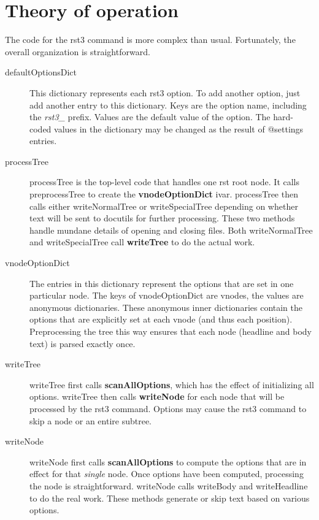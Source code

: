 \documentclass[a4paper,10pt,english]{sphinxmanual}
\begin{document}
\section{Theory of operation}
\label{rstplugin3:theory-of-operation}
The code for the rst3 command is more complex than usual. Fortunately, the
overall organization is straightforward.
\begin{description}
\item[{defaultOptionsDict}] \leavevmode
This dictionary represents each rst3 option.
To add another option, just add another entry to this dictionary.
Keys are the option name, including the \emph{rst3\_} prefix.
Values are the default value of the option.
The hard-coded values in the dictionary may be changed as the result of @settings entries.

\item[{processTree}] \leavevmode
processTree is the top-level code that handles one rst root node.
It calls preprocessTree to create the \textbf{vnodeOptionDict} ivar.
processTree then calls either writeNormalTree or writeSpecialTree
depending on whether text will be sent to docutils for further processing.
These two methods handle mundane details of opening and closing files.
Both writeNormalTree and writeSpecialTree call \textbf{writeTree} to do the actual work.

\item[{vnodeOptionDict}] \leavevmode
The entries in this dictionary represent the options that are set in one particular node.
The keys of vnodeOptionDict are vnodes, the values are anonymous dictionaries.
These anonymous inner dictionaries contain the options that are explicitly set at each vnode
(and thus each position).
Preprocessing the tree this way ensures that each node (headline and body text) is parsed exactly once.

\item[{writeTree}] \leavevmode
writeTree first calls \textbf{scanAllOptions}, which has the effect of
initializing all options. writeTree then calls \textbf{writeNode} for each node
that will be processed by the rst3 command. Options may cause the rst3 command to
skip a node or an entire subtree.

\item[{writeNode}] \leavevmode
writeNode first calls \textbf{scanAllOptions} to compute the options that are in
effect for that \emph{single} node. Once options have been computed, processing the
node is straightforward. writeNode calls writeBody and writeHeadline
to do the real work. These methods generate or skip text based on various
options.


\end{description}
\end{document}
